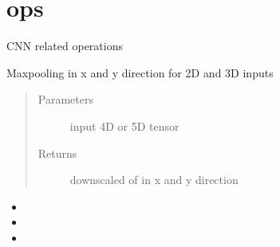 \documentclass[letterpaper,10pt,english]{sphinxmanual}
\begin{document}
\section{ops}
\label{\detokenize{index:module-boundary.ops}}\label{\detokenize{index:ops}}
CNN related operations

\begin{fulllineitems}
\label{\detokenize{index:boundary.ops.MaxPoolingND}}
Maxpooling in x and y direction for 2D and 3D inputs
\begin{quote}\begin{description}
\item[{Parameters}] \leavevmode
{} \textendash{} input 4D or 5D tensor

\item[{Returns}] \leavevmode
downscaled of  in x and y direction

\end{description}\end{quote}



\begin{itemize}
\item {} 

\item {} 

\item {} 

\end{itemize}



\end{fulllineitems}

\end{document}
